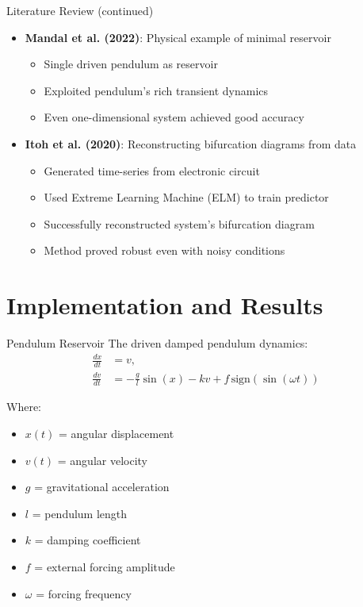 \documentclass{beamer}
\begin{document}
\begin{frame}{Literature Review (continued)}
\begin{itemize}
\item \textbf{Mandal et al. (2022)}: Physical example of minimal reservoir
    \begin{itemize}
    \item Single driven pendulum as reservoir
    \item Exploited pendulum's rich transient dynamics
    \item Even one-dimensional system achieved good accuracy
    \end{itemize}
\item \textbf{Itoh et al. (2020)}: Reconstructing bifurcation diagrams from data
    \begin{itemize}
    \item Generated time-series from electronic circuit
    \item Used Extreme Learning Machine (ELM) to train predictor
    \item Successfully reconstructed system's bifurcation diagram
    \item Method proved robust even with noisy conditions
    \end{itemize}
\end{itemize}
\end{frame}

\section{Implementation and Results}

\begin{frame}{Pendulum Reservoir}
The driven damped pendulum dynamics:
\begin{equation}
\begin{aligned}
\frac{dx}{dt} &= v, \\
\frac{dv}{dt} &= -\frac{g}{l} \sin(x) - k v + f \, \text{sign}(\sin(\omega t))
\end{aligned}
\end{equation}

Where:
\begin{itemize}
\item $x(t)$ = angular displacement
\item $v(t)$ = angular velocity
\item $g$ = gravitational acceleration
\item $l$ = pendulum length
\item $k$ = damping coefficient
\item $f$ = external forcing amplitude
\item $\omega$ = forcing frequency
\end{itemize}
\end{frame}
\end{document}
